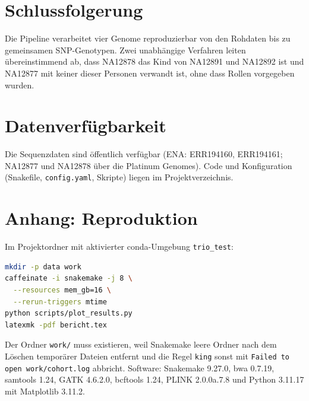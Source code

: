 \documentclass[10pt,a4paper,twocolumn]{article}
\begin{document}
\section{Schlussfolgerung}
Die Pipeline verarbeitet vier Genome reproduzierbar von den Rohdaten bis zu gemeinsamen SNP-Genotypen. Zwei unabhängige Verfahren leiten übereinstimmend ab, dass NA12878 das Kind von NA12891 und NA12892 ist und NA12877 mit keiner dieser Personen verwandt ist, ohne dass Rollen vorgegeben wurden.

\section*{Datenverfügbarkeit}
Die Sequenzdaten sind öffentlich verfügbar (ENA: ERR194160, ERR194161; NA12877 und NA12878 über die Platinum Genomes). Code und Konfiguration (Snakefile, \texttt{config.yaml}, Skripte) liegen im Projektverzeichnis.

\section*{Anhang: Reproduktion}
Im Projektordner mit aktivierter conda-Umgebung \texttt{trio\_test}:
\begin{lstlisting}[language=bash]
mkdir -p data work
caffeinate -i snakemake -j 8 \
  --resources mem_gb=16 \
  --rerun-triggers mtime
python scripts/plot_results.py
latexmk -pdf bericht.tex
\end{lstlisting}
Der Ordner \texttt{work/} muss existieren, weil Snakemake leere Ordner nach dem Löschen temporärer Dateien entfernt und die Regel \texttt{king} sonst mit \texttt{Failed to open work/cohort.log} abbricht. Software: Snakemake 9.27.0, bwa 0.7.19, samtools 1.24, GATK 4.6.2.0, bcftools 1.24, PLINK 2.0.0a.7.8 und Python 3.11.17 mit Matplotlib 3.11.2.



\end{document}
